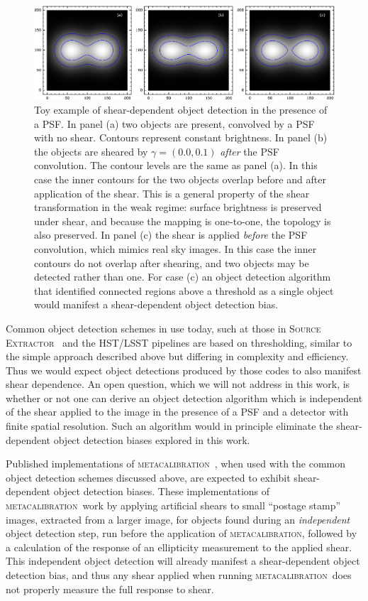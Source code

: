 \documentclass[fleqn,useAMS,usenatbib]{mnras}
\newcommand{\mcal}{\textsc{metacalibration}}
\newcommand{\sx}{\textsc{Source Extractor}}
\begin{document}
\begin{figure}
  \includegraphics[width=\textwidth]{figures/toy.png}

  \caption{ Toy example of shear-dependent object detection in the presence of
    a PSF.  In panel (a) two objects are present, convolved by a PSF with no
    shear.  Contours represent constant brightness.  In panel (b) the objects
    are sheared by $\gamma = (0.0, 0.1)$ {\em after} the PSF convolution.  The
    contour levels are the same as panel (a).  In this case the inner contours
    for the two objects overlap before and after application of the shear. This
    is a general property of the shear transformation in the weak regime:
    surface brightness is preserved under shear, and because the mapping is
    one-to-one, the topology is also preserved. In panel (c) the shear is
    applied {\em before} the PSF convolution, which mimics real sky images. In
    this case the inner contours do not overlap after shearing, and two objects
    may be detected rather than one.  For case (c) an object detection
    algorithm that identified connected regions above a threshold as a single
    object would manifest a shear-dependent object detection bias.
    \label{fig:toy} }

\end{figure}

Common object detection schemes in use today, such at those in \sx\ 
\citep{Bertin96} and the HST/LSST pipelines \citep{BoschHSC2018,BoschLSST2018}
are based on thresholding, similar to the simple approach described above but
differing in complexity and efficiency. Thus we would expect object detections
produced by those codes to also manifest shear dependence. An open question,
which we will not address in this work, is whether or not one can derive an
object detection algorithm which is independent of the shear applied to the
image in the presence of a PSF and a detector with finite spatial resolution.
Such an algorithm would in principle eliminate the shear-dependent object
detection biases explored in this work.

Published implementations of \mcal\
\citep[e.g.,][]{HuffMcal2017,SheldonMcal2017}, when used with the common object
detection schemes discussed above, are expected to exhibit shear-dependent
object detection biases. These implementations of \mcal\ work by applying
artificial shears to small ``postage stamp'' images, extracted from a larger
image, for objects found during an {\em independent} object detection step, run
before the application of \mcal, followed by a calculation of the response of
an ellipticity measurement to the applied shear. This independent object
detection will already manifest a shear-dependent object detection bias, and
thus any shear applied when running \mcal\ does not properly measure the full
response to shear.
\end{document}
